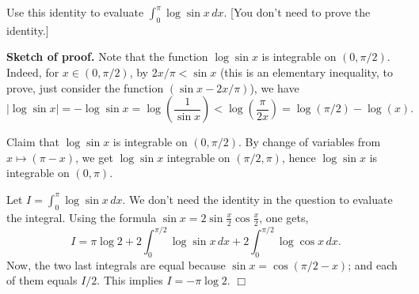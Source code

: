 \documentclass{article}
\begin{document}
Use this identity to evaluate $\int_0^{\pi}\log \sin x\,dx$. {[}You
don't need to prove the identity.{]}

    \textbf{Sketch of proof.} Note that the function $\log \sin x$ is
integrable on $(0,\pi/2)$. Indeed, for $x \in (0, \pi/2)$, by
$2x/\pi <  \sin x$ (this is an elementary inequality, to prove, just
consider the function $(\sin x - 2x/\pi)$), we have
\[|\log\sin x| = - \log \sin x = \log \left(\frac{1}{\sin x}\right) < \log \left (\frac{\pi}{2 x}\right) =  \log(\pi/2) - \log (x).\]

Claim that $\log\sin x$ is integrable on $(0,\pi/2)$. By change of
variables from $x \mapsto (\pi - x)$, we get $\log \sin x$ integrable on
$(\pi/2,\pi)$, hence $\log\sin x$ is integrable on $(0,\pi)$.

Let $I=\int_0^{\pi}\log \sin x\,dx$. We don't need the identity in the
question to evaluate the integral. Using the formula
$\sin x = 2\sin \frac{x}{2}\cos\frac{x}{2}$, one gets,
\[I =\pi \log 2 + 2\int_0^{\pi/2}\log \sin x\,dx + 2\int_0^{\pi/2}\log \cos x\,dx.\]
Now, the two last integrals are equal because $\sin x = \cos(\pi/2-x)$;
and each of them equals $I/2$. This implies $I = -\pi\log 2$. $\Box$


    
    
    
    
\end{document}
